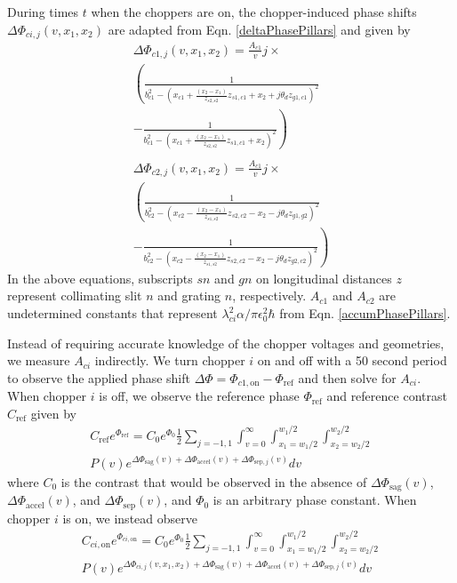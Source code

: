 \documentclass[twocolumn,prl,showpacs,superscriptaddress]{revtex4-1}   %
\newcommand{\eqnref}[1]{Eqn. \eqref{#1}}
\newcommand{\dphisep}{\Delta\Phi_{\mathrm{sep}}}
\newcommand{\dphisepj}{\Delta\Phi_{\mathrm{sep},j}}
\newcommand{\dphisag}{\Delta\Phi_{\mathrm{sag}}}
\newcommand{\dphiaccel}{\Delta\Phi_{\mathrm{accel}}}
\begin{document}
During times $t$ when the choppers are on, the chopper-induced phase shifts $\Delta\Phi_{ci,j}(v,x_1,x_2)$ are adapted from \eqnref{deltaPhasePillars} and given by
\begin{align}
	\Delta\Phi_{c1,j}(v,x_1,x_2) = \frac{A_{c1}}{v}j \times \nonumber \\
	\left(
		\frac{1}{b_{c1}^2 -
			(x_{c1} + \frac{(x_2-x_1)}{z_{s2,s2}}z_{s1,c1} + x_2 + j\theta_d z_{g1,c1})^2
		}
		\right. \nonumber \\ - \left.
		\frac{1}{b_{c1}^2 -
			(x_{c1} + \frac{(x_2-x_1)}{z_{s2,s2}}z_{s1,c1} + x_2)^2
		}
	\right)
	\nonumber \\ 
	\nonumber \\	
	\Delta\Phi_{c2,j}(v,x_1,x_2) = \frac{A_{c1}}{v}j \times \nonumber \\
	\left(
		\frac{1}{b_{c2}^2 -
			(x_{c2} - \frac{(x_2-x_1)}{z_{s1,s2}}z_{s2,c2} - x_2 - j\theta_d z_{g1,g2})^2
		}
		\right. \nonumber \\ - \left.
		\frac{1}{b_{c2}^2 -
			(x_{c2} - \frac{(x_2-x_1)}{z_{s1,s2}}z_{s2,c2} - x_2 - j\theta_d z_{g2,c2})^2
		}
	\right)
	\label{phic1c2}
\end{align}
In the above equations, subscripts $sn$ and $gn$ on longitudinal distances $z$ represent collimating slit $n$ and grating $n$, respectively. $A_{c1}$ and $A_{c2}$ are undetermined constants that represent $\lambda_{ci}^2 \alpha / \pi \epsilon_0^2 \hbar$ from \eqnref{accumPhasePillars}. 

Instead of requiring accurate knowledge of the chopper voltages and geometries, we measure $A_{ci}$ indirectly. We turn chopper $i$ on and off with a 50 second period to observe the applied phase shift $\Delta\Phi = \Phi_{c1,\mathrm{on}} - \Phi_{\mathrm{ref}}$ and then solve for $A_{ci}$. When chopper $i$ is off, we observe the reference phase $\Phi_{\mathrm{ref}}$ and reference contrast $C_{\mathrm{ref}}$ given by 
\begin{align}
	C_{\mathrm{ref}}e^{\Phi_{\mathrm{ref}}} = 
		C_0e^{\Phi_0} \frac{1}{2} \sum_{j=-1,1}
		\int_{v=0}^{\infty}
		\int_{x_1=w_1/2}^{w_1/2}
		\int_{x_2=w_2/2}^{w_2/2} 
		\nonumber \\
		P(v) e^{\dphisag(v) + \dphiaccel(v) + \dphisepj(v)} 
		dv
	\label{CPChoppersRef}
\end{align}
where $C_0$ is the contrast that would be observed in the absence of $\dphisag(v)$, $\dphiaccel(v)$, and $\dphisep(v)$, and $\Phi_0$ is an arbitrary phase constant. When chopper $i$ is on, we instead observe
\begin{align}
	C_{ci,\mathrm{on}}e^{\Phi_{ci,\mathrm{on}}} = 
		C_0e^{\Phi_0} \frac{1}{2} \sum_{j=-1,1}
		\int_{v=0}^{\infty}
		\int_{x_1=w_1/2}^{w_1/2}
		\int_{x_2=w_2/2}^{w_2/2} 
		\nonumber \\
		P(v) e^{\Delta\Phi_{ci,j}(v,x_1,x_2) + \dphisag(v) + \dphiaccel(v) + \dphisepj(v)} 
		dv
	\label{CPChoppersOn}
\end{align}
\end{document}
